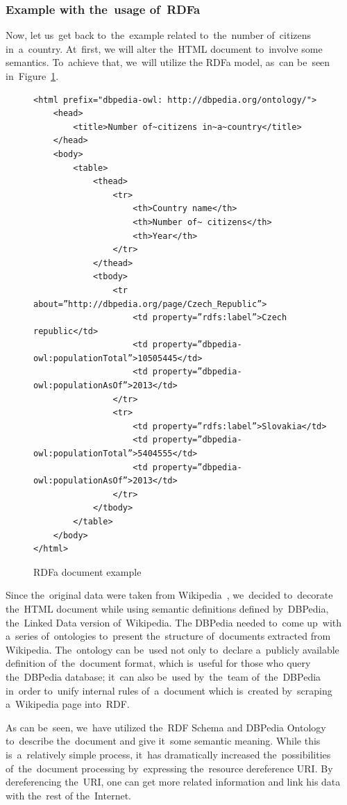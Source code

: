 \subsubsection{Example with the~usage of~RDFa}

Now, let us~get back to~the~example related to~the~number of~citizens in~a~country. At~first, we
will alter the~HTML document to~involve some semantics. To~achieve that, we~will utilize the
RDFa model, as~can be~seen in~Figure~\ref{fig:example-rdfa}.

\begin{figure}
\scriptsize\begin{verbatim}
<html prefix="dbpedia-owl: http://dbpedia.org/ontology/">
    <head>
        <title>Number of~citizens in~a~country</title>
    </head>
    <body>
        <table>
            <thead>
                <tr>
                    <th>Country name</th>
                    <th>Number of~ citizens</th>
                    <th>Year</th>
                </tr>
            </thead>
            <tbody>
                <tr about=”http://dbpedia.org/page/Czech_Republic”>
                    <td property=”rdfs:label”>Czech republic</td>
                    <td property=”dbpedia-owl:populationTotal”>10505445</td>
                    <td property=”dbpedia-owl:populationAsOf”>2013</td>
                </tr>
                <tr>
                    <td property=”rdfs:label”>Slovakia</td>
                    <td property=”dbpedia-owl:populationTotal”>5404555</td>
                    <td property=”dbpedia-owl:populationAsOf”>2013</td>
                </tr>
            </tbody>
        </table>
    </body>
</html>
\end{verbatim}\normalsize
\caption{RDFa document example}
\label{fig:example-rdfa}
\end{figure}

Since the~original data were taken from Wikipedia~\cite{wikipedia}, we~decided to~decorate the~HTML document
while using semantic definitions defined by~DBPedia, the~Linked Data version of~Wikipedia. 
The DBPedia needed to~come up~with a~series of~ontologies to~present the~structure of~documents
extracted from Wikipedia. The~ontology can be~used not only to~declare a~publicly available definition of~the~document format, which is~useful for those who query the~DBPedia database; it~can also be~used by~the~team of~the~DBPedia in~order to~unify internal rules of~a~document which is~created by~scraping a~Wikipedia page into~RDF.

As can be~seen, we~have utilized the~RDF Schema and DBPedia Ontology to~describe the~document
and give it~some semantic meaning. While this is~a~relatively simple process, it~has dramatically
increased the~possibilities of~the~document processing by~expressing the~resource dereference URI.
By dereferencing the~URI, one can get more related information and link his data with the~rest
of the~Internet.

